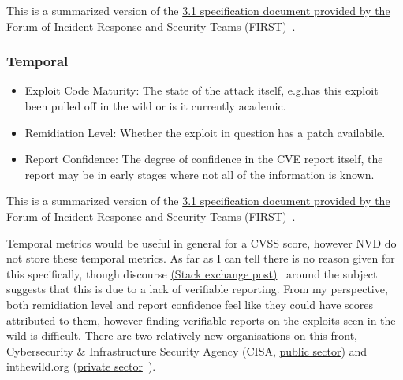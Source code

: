 \documentclass[12pt]{article}
\begin{document}
{\footnotesize This is a summarized version of the
\href{https://www.first.org/cvss/v3.1/specification-document}{3.1 specification document
	provided by the  Forum of Incident Response and Security Teams (FIRST)}~\cite{CVSS_31}. } \\


\subsubsection*{Temporal}

\begin{itemize}

	\item Exploit Code Maturity: The state of the attack itself, e.g.\@ has this exploit been pulled
	      off in the wild or is it currently academic.

	\item Remidiation Level: Whether the exploit in question has a patch availabile.

	\item Report Confidence: The degree of confidence in the CVE report itself, the report may be in
	      early stages where not all of the information is known.

\end{itemize}

{\footnotesize This is a summarized version of the
\href{https://www.first.org/cvss/v3.1/specification-document}{3.1 specification document
	provided by the Forum of Incident Response and Security Teams (FIRST)}~\cite{CVSS_31}.}  \\
\bigskip

Temporal metrics would be useful in general for a CVSS score, however NVD do not store these
temporal metrics. As far as I can tell there is no reason given for this specifically, though
discourse
\href{https://security.stackexchange.com/questions/270257/cvss-v3-and-v3-1-missing-temporal-metrics-exploit-code-maturity-and-remediation
}{(Stack exchange post)}~\cite{stack_exchange} around the subject suggests that this is due to a lack
of verifiable reporting. From my perspective, both remidiation level and report confidence feel like
they could have scores attributed to them, however finding verifiable reports on the exploits seen
in the wild is difficult. There are two relatively new organisations on this front,
Cybersecurity \& Infrastructure Security Agency (CISA,
\href{https://www.cisa.gov/known-exploited-vulnerabilities-catalog}{public sector}) and
inthewild.org (\href{https://inthewild.io/}{private sector}~\cite{cisa}).
\end{document}
